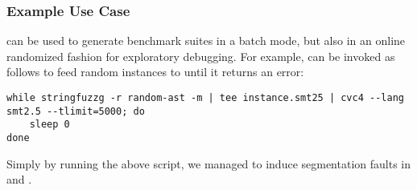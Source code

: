 \subsubsection{Example Use Case}

\fuzzer{} can be used to generate benchmark suites in a batch mode, but also
in an online randomized fashion for exploratory debugging. For example,
\fuzzer{} can be invoked as follows to feed random instances to \cvc{} until it
returns an error:
{\scriptsize\begin{verbatim}
while stringfuzzg -r random-ast -m | tee instance.smt25 | cvc4 --lang smt2.5 --tlimit=5000; do
    sleep 0
done\end{verbatim}}

Simply by running the above script, we managed to induce segmentation faults
in \cvc{} and \us{}.
